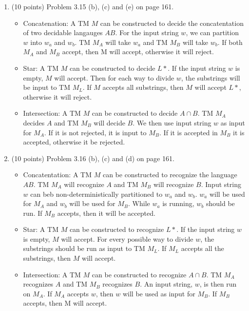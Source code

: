 \documentclass[11pt]{article}
\begin{document}
\begin{enumerate}
  \item (10 points) Problem 3.15 (b), (c) and (e) on page 161.
    \begin{itemize}
     \item Concatenation: A TM $M$ can be constructed to decide the concatentation of two decidable langauges $AB$. For the input string
     $w$, we can partition $w$ into $w_a$ and $w_b$. TM $M_A$ will take $w_a$ and TM $M_B$ will take $w_b$. If both
     $M_A$ and $M_B$ accept, then M will accept, otherwise it will reject.
     
     \item Star: A TM $M$ can be constructed to decide $L*$. If the input string $w$ is empty, $M$ will accept. Then for each way to divide
     $w$, the substrings will be input to TM $M_L$. If $M$ accepts all substrings, then $M$ will accept $L*$, otherwise it will reject.
     
     \item Intersection: A TM $M$ can be constructed to decide $A \cap B$. TM $M_A$ decides $A$ and TM $M_B$ will decide $B$. We then use
     input string $w$ as input for $M_A$. If it is not rejected, it is input to $M_B$. If it is accepted in $M_B$ it is accepted, otherwise
     it be rejected.
    \end{itemize}

      
  \item (10 points) Problem 3.16 (b), (c) and (d) on page 161.
  \begin{itemize}
    \item Concatentation: A TM $M$ can be constructed to recognize the language $AB$. TM $M_A$ will recognize $A$ and TM $M_B$ will 
	  recognize $B$. Input string $w$ can beb non-deterministically partitioned to $w_a$ and $w_b$. $w_a$ will be used for $M_A$ and
	  $w_b$ will be used for $M_B$. While $w_a$ is running, $w_b$ should be run. If $M_B$ accepts, then it will be accepted.
    \item Star: A TM $M$ can be constructed to recognize $L*$. If the input string $w$ is empty, $M$ will accept. For every possible way to
	  divide $w$, the substrings should be run as input to TM $M_L$. If $M_L$ accepts all the substrings, then $M$ will accept.
    \item Intersection: A TM $M$ can be constructed to recognize $A \cap B$. TM $M_A$ recognizes $A$ and TM $M_B$ recognizes $B$. An input
	  string, $w$, is then run on $M_A$. If $M_A$ accepts $w$, then $w$ will be used as input for $M_B$. If $M_B$ accepts, then M will
	  accept.
  \end{itemize}

\end{enumerate}
\end{document}

